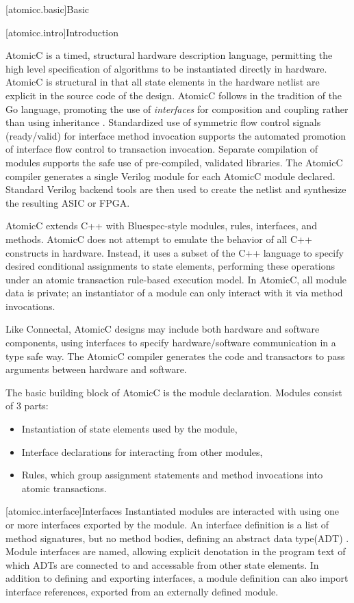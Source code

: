 [atomicc.basic]{Basic}

[atomicc.intro]{Introduction}

AtomicC is a timed, structural hardware description language, permitting
the high level specification of algorithms to be instantiated
directly in hardware.
AtomicC is structural in that all state elements in the hardware
netlist are explicit in the source code of the design.
AtomicC follows in the tradition of the Go language,
promoting the use of \textit{interfaces} for composition and
coupling rather than using inheritance \cite{Pike2012}.
Standardized use of symmetric flow control signals (ready/valid) for
interface method invocation
supports the automated promotion of interface flow control to transaction invocation.
Separate compilation of modules 
supports the safe use of pre-compiled, validated
libraries.
The AtomicC compiler 
generates a single Verilog module for each AtomicC module declared.
Standard Verilog backend tools are then used to create the netlist and synthesize
the resulting ASIC or FPGA.

AtomicC extends C++
with Bluespec-style\cite{Bluespec:www,Hoe:Thesis,HoeArvind:TRS_Synthesis2}
modules, rules, interfaces, and methods.
AtomicC does not attempt to emulate the behavior of all C++ constructs in hardware.
Instead, it uses a subset of the C++ language to specify desired
conditional assignments to state elements,
performing these operations under an atomic transaction rule-based execution model.
In AtomicC, all module data is private; an instantiator of a module can only 
interact with it via method invocations.

Like Connectal, AtomicC designs may include both hardware and
software components, using interfaces to specify hardware/software communication
in a type safe way. The AtomicC compiler generates the code and transactors to pass
arguments between hardware and software.

The basic building block of AtomicC is the module declaration.
Modules consist of 3 parts:
\begin{itemize}
\item Instantiation of state elements used by the module,
\item Interface declarations for interacting from other modules,
\item Rules, which group assignment statements and method invocations into atomic transactions.
\end{itemize}

[atomicc.interface]{Interfaces}
Instantiated modules are interacted with using one or more interfaces exported by the module.
An interface definition is a list of method signatures, but no method bodies, defining
an abstract data type(ADT) \cite{Liskov74programmingwith}.
Module interfaces are named, 
allowing explicit denotation in the program text
of which ADTs are connected to and accessable from other state elements.
In addition to defining and exporting interfaces,
a module definition can also import
interface references, exported from an
externally defined module.

